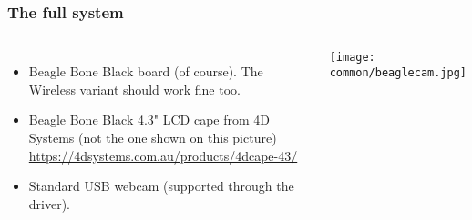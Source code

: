 \begin{frame}
  \frametitle{The full system}
  \begin{columns}
    \begin{itemize}
        \item Beagle Bone Black board (of course). The Wireless variant
              should work fine too.
      \item Beagle Bone Black 4.3" LCD cape from 4D Systems (not the one shown on this picture)\\
              {\small \url{https://4dsystems.com.au/products/4dcape-43/}}
        \item Standard USB webcam (supported through the 
              driver).
    \end{itemize}
     \texttt{[image: common/beaglecam.jpg]}
  \end{columns}
\end{frame}
